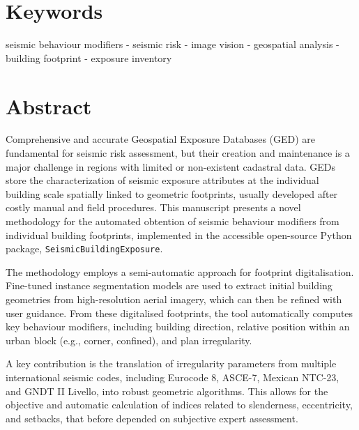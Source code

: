 \begin{refsection}
\section*{Keywords}


seismic behaviour modifiers - seismic risk - image vision - geospatial analysis - building footprint - exposure inventory




\section*{Abstract}
Comprehensive and accurate Geospatial Exposure Databases (GED) are fundamental for seismic risk assessment, but their creation and maintenance is a major challenge in regions with limited or non-existent cadastral data. GEDs store the characterization of seismic exposure attributes at the individual building scale spatially linked to geometric footprints, usually developed after costly manual and field procedures. This manuscript presents a novel methodology for the automated obtention of seismic behaviour modifiers from individual building footprints, implemented in the accessible open-source Python package, \texttt{SeismicBuildingExposure}.

The methodology employs a semi-automatic approach for footprint digitalisation. Fine-tuned instance segmentation models are used to extract initial building geometries from high-resolution aerial imagery, which can then be refined with user guidance. From these digitalised footprints, the tool automatically computes key behaviour modifiers, including building direction, relative position within an urban block (e.g., corner, confined), and plan irregularity.

A key contribution is the translation of irregularity parameters from multiple international seismic codes, including Eurocode 8, ASCE-7, Mexican NTC-23, and GNDT II Livello, into robust geometric algorithms. This allows for the objective and automatic calculation of indices related to slenderness, eccentricity, and setbacks, that before depended on subjective expert assessment. 


\end{refsection}

